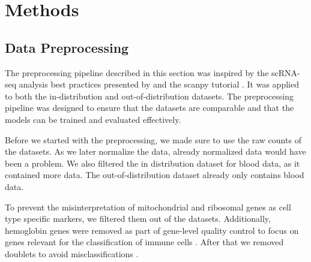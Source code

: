 \documentclass[11pt]{article}
\begin{document}
\section{Methods}\label{sec:methods}


\subsection{Data Preprocessing}\label{sec:methods:data-preprocessing}


The preprocessing pipeline described in this section was inspired by the scRNA-seq analysis best practices presented by \textcite{luecken_current_2019} and the scanpy tutorial \cite{scanpy_development_team_preprocessing_2026}.
It was applied to both the in-distribution and out-of-distribution datasets. The preprocessing pipeline was designed to ensure that the datasets are comparable and that the models can be trained and evaluated effectively.

Before we started with the preprocessing, we made sure to use the raw counts of the datasets. As we later normalize the data, already normalized data would have been a problem. We also filtered the in distribution dataset for blood data, as it contained more data. The out-of-distribution dataset already only contains blood data.

To prevent the misinterpretation of mitochondrial and ribosomal genes as cell type specific markers, we filtered them out of the datasets. Additionally, hemoglobin genes were removed as part of gene-level quality control to focus on genes relevant for the classification of immune cells \cite{ding_systematic_2020, luecken_current_2019}. %
After that we removed doublets to avoid misclassifications \cite{scanpy_development_team_preprocessing_2026}.
\end{document}
